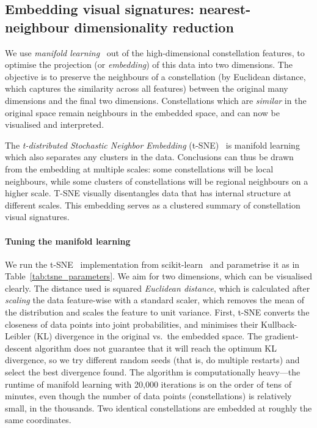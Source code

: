 \documentclass[10pt]{article}
\begin{document}
\subsection{Embedding visual signatures: nearest-neighbour dimensionality reduction}
\label{sec:tsne}

We use \emph{manifold learning}~\cite{gorban2008principal} out of the high-dimensional constellation features, to optimise the projection (or \emph{embedding}) of this data into two dimensions. The objective is to preserve the neighbours of a constellation (by Euclidean distance, which captures the similarity across all features) between the original many dimensions and the final two dimensions. Constellations which are \emph{similar} in the original space remain neighbours in the embedded space, and can now be visualised and interpreted.

The \emph{t-distributed Stochastic Neighbor Embedding} (t-SNE)~\cite{van2008visualizing,van2014accelerating} is manifold learning which also separates any clusters in the data. Conclusions can thus be drawn from the embedding at multiple scales: some constellations will be local neighbours, while some clusters of constellations will be regional neighbours on a higher scale. T-SNE visually disentangles data that has internal structure at different scales. This embedding serves as a clustered summary of constellation visual signatures. 

\paragraph{Tuning the manifold learning} We run the t-SNE~\cite{van2008visualizing,van2014accelerating} implementation from scikit-learn~\cite{scikit-learn} and parametrise it as in Table~\ref{tab:tsne_parameters}. We aim for two dimensions, which can be visualised clearly. The distance used is squared \emph{Euclidean distance}, which is calculated after \emph{scaling} the data feature-wise with a standard scaler, which removes the mean of the distribution and scales the feature to unit variance. First, t-SNE converts the closeness of data points into joint probabilities, and minimises their Kullback-Leibler (KL) divergence in the original vs.\ the embedded space. The gradient-descent algorithm does not guarantee that it will reach the optimum KL divergence, so we try different random seeds (that is, do multiple restarts) and select the best divergence found. The algorithm is computationally heavy---the runtime of manifold learning with 20,000 iterations is on the order of tens of minutes, even though the number of data points (constellations) is relatively small, in the thousands. Two identical constellations are embedded at roughly the same coordinates.
\end{document}
